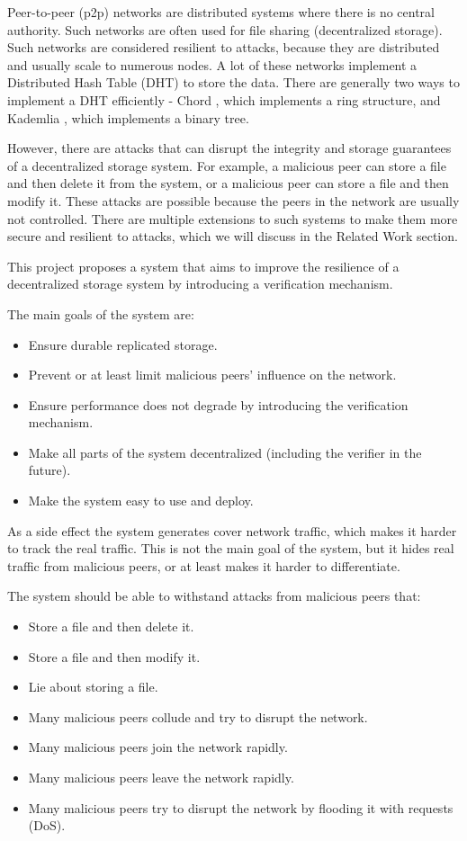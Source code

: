 \documentclass[ twoside,openright,titlepage,numbers=noenddot,headinclude,%
                footinclude=true,cleardoublepage=empty,abstractoff, %
                BCOR=5mm,paper=a4,fontsize=11pt,%
                ngerman,american,%
                ]{scrreprt}
\begin{document}
Peer-to-peer (p2p) networks are distributed systems where there is no central authority.
Such networks are often used for file sharing (decentralized storage).
Such networks are considered resilient to attacks,
because they are distributed and usually scale to numerous nodes.
A lot of these networks implement a Distributed Hash Table (DHT) to store the data.
There are generally two ways to implement a DHT efficiently - 
Chord \cite{chord}, which implements a ring structure,
and Kademlia \cite{kademlia}, which implements a binary tree.

However, there are attacks that can disrupt the integrity and
storage guarantees of a decentralized storage system.
For example, a malicious peer can store a file and then delete it from the system,
or a malicious peer can store a file and then modify it.
These attacks are possible because the peers in the network are usually not controlled.
There are multiple extensions to such systems to make them more secure and resilient to attacks,
which we will discuss in the Related Work section.

This project proposes a system that aims to improve the resilience of a decentralized storage system
by introducing a verification mechanism.

The main goals of the system are:
\begin{itemize}
    \item Ensure durable replicated storage.
    \item Prevent or at least limit malicious peers' influence on the network.
    \item Ensure performance does not degrade by introducing the verification mechanism.
    \item Make all parts of the system decentralized (including the verifier in the future).
    \item Make the system easy to use and deploy.
\end{itemize}

As a side effect the system generates cover network traffic, which makes it harder to track the real traffic.
This is not the main goal of the system, but it hides real traffic from malicious peers,
or at least makes it harder to differentiate.

The system should be able to withstand attacks from malicious peers that:
\begin{itemize}
    \item Store a file and then delete it.
    \item Store a file and then modify it.
    \item Lie about storing a file.
    \item Many malicious peers collude and try to disrupt the network.
    \item Many malicious peers join the network rapidly.
    \item Many malicious peers leave the network rapidly.
    \item Many malicious peers try to disrupt the network by flooding it with requests (DoS).
\end{itemize}
\end{document}
